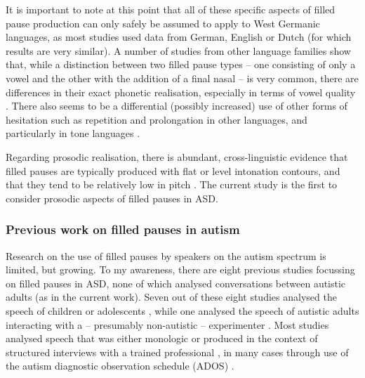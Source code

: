 It is important to note at this point that all of these specific aspects of filled pause production can only safely be assumed to apply to West Germanic languages, as most studies used data from German, English or Dutch (for which results are very similar). A number of studies from other language families show that, while a distinction between two filled pause types -- one consisting of only a vowel and the other with the addition of a final nasal -- is very common, there are differences in their exact phonetic realisation, especially in terms of vowel quality \citep{anansiripinyoAcousticphoneticCharacteristicsThai2019, dinapoliFilledPausesProlongations2020,kosmalaDualStatusFilled2022,nguyenAcousticCorrelatesListeneridentified2015,schettinoPhoneticFunctionalFeatures2019,yuanPausesPauseFillers2016}. There also seems to be a differential (possibly increased) use of other forms of hesitation such as repetition and prolongation in other languages, and particularly in tone languages \citep{betzProlongationGerman2017,leeProlongationSpontaneousMandarin2004,tsengTaxonomySpontaneousSpeech2003}.

Regarding prosodic realisation, there is abundant, cross-linguistic evidence that filled pauses are typically produced with flat or level intonation contours, and that they tend to be relatively low in pitch \citep{adellModellingFilledPauses2010,belzPitchCharacteristicsFilled2015,oshaughnessyRecognitionHesitationsSpontaneous1992,shribergIntonationClauseinternalFilled1993}. The current study is the first to consider prosodic aspects of filled pauses in ASD.


\subsubsection{Previous work on filled pauses in autism}\label{BCFP_FP_background_ASD}

Research on the use of filled pauses by speakers on the autism spectrum is limited, but growing. To my awareness, there are eight previous studies focussing on filled pauses in ASD, none of which analysed conversations between autistic adults (as in the current work). Seven out of these eight studies analysed the speech of children or adolescents \citep{gormanUhUmChildren2016,irvineUhUmAutism2016,jonesItImportantFrequency2022,lunsfordAutismUseFillers2010,mcgregorBriefReportUm2020,parish-morrisLinguisticCamouflageGirls2017,suhNarrativePerformanceOptimal2014}, while one analysed the speech of autistic adults interacting with a -- presumably non-autistic -- experimenter \citep{lakeListenerVsSpeakeroriented2011}. Most studies analysed speech that was either monologic or produced in the context of structured interviews with a trained professional \citep[with the exception of][here, semi-structured double interviews were used]{jonesItImportantFrequency2022}, in many cases through use of the autism diagnostic observation schedule (ADOS) \citep{lordAutismDiagnosticObservation2000}.

